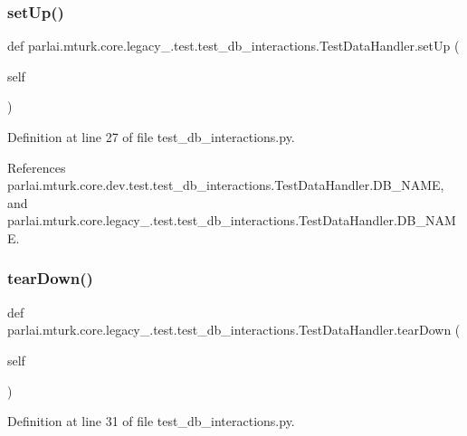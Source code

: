 \subsubsection{\texorpdfstring{set\+Up()}{setUp()}}
{\footnotesize\ttfamily def parlai.\+mturk.\+core.\+legacy\+\_.\+test.\+test\+\_\+db\+\_\+interactions.\+Test\+Data\+Handler.\+set\+Up (\begin{DoxyParamCaption}\item[{}]{self }\end{DoxyParamCaption})}



Definition at line 27 of file test\+\_\+db\+\_\+interactions.\+py.



References parlai.\+mturk.\+core.\+dev.\+test.\+test\+\_\+db\+\_\+interactions.\+Test\+Data\+Handler.\+D\+B\+\_\+\+N\+A\+ME, and parlai.\+mturk.\+core.\+legacy\+\_.\+test.\+test\+\_\+db\+\_\+interactions.\+Test\+Data\+Handler.\+D\+B\+\_\+\+N\+A\+ME.

\mbox{\label{classparlai_1_1mturk_1_1core_1_1legacy__2018_1_1test_1_1test__db__interactions_1_1TestDataHandler_a3df8c585d2e6f30b5ebbc40a51da5bbd}} 
\subsubsection{\texorpdfstring{tear\+Down()}{tearDown()}}
{\footnotesize\ttfamily def parlai.\+mturk.\+core.\+legacy\+\_.\+test.\+test\+\_\+db\+\_\+interactions.\+Test\+Data\+Handler.\+tear\+Down (\begin{DoxyParamCaption}\item[{}]{self }\end{DoxyParamCaption})}



Definition at line 31 of file test\+\_\+db\+\_\+interactions.\+py.



